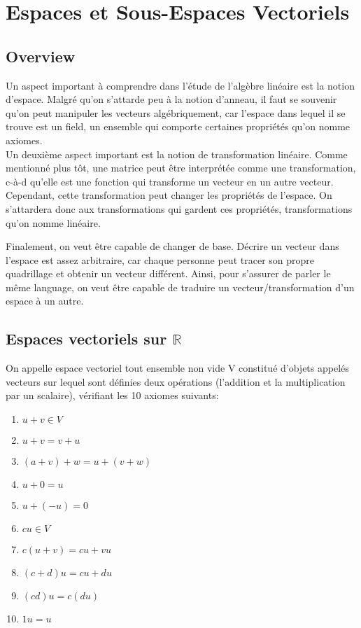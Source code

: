 \documentclass{article}
\begin{document}
\pagebreak

\section{Espaces et Sous-Espaces Vectoriels}
\subsection{Overview}

Un aspect important à comprendre dans l'étude de l'algèbre linéaire est la notion
d'espace. Malgré qu'on s'attarde peu à la notion d'anneau, il faut se souvenir
qu'on peut manipuler les vecteurs algébriquement, car l'espace dans lequel il se
trouve est un field, un ensemble qui comporte certaines propriétés qu'on nomme
axiomes.\\

Un deuxième aspect important est la notion de transformation linéaire. Comme mentionné
plus tôt, une matrice peut être interprétée comme une transformation, c-à-d qu'elle
est une fonction qui transforme un vecteur en un autre vecteur. Cependant, cette
transformation peut changer les propriétés de l'espace. On s'attardera donc aux
transformations qui gardent ces propriétés, transformations qu'on nomme linéaire.

Finalement, on veut être capable de changer de base. Décrire un vecteur dans
l'espace est assez arbitraire, car chaque personne peut tracer son propre quadrillage
et obtenir un vecteur différent. Ainsi, pour s'assurer de parler le même language,
on veut être capable de traduire un vecteur/transformation d'un espace à un autre.

\subsection{Espaces vectoriels sur $\mathbb{R}$}

\begin{definition}
    On appelle espace vectoriel tout ensemble non vide V constitué
    d'objets appelés vecteurs sur lequel sont définies deux opérations
    (l'addition et la multiplication par un scalaire), vérifiant les
    10 axiomes suivants:
    \begin{enumerate}
	\item $u+v \in V$
	\item $u+v = v+u$
	\item $(a+v)+w=u+(v+w)$
	\item $u+0=u$
	\item $u+(-u)=0$
	\item $ cu \in V$
	\item $ c(u+v)=cu+vu$
	\item $ (c+d)u=cu+du$
	\item $ (cd)u=c(du)$
	\item $1u=u$
    \end{enumerate}
\end{definition}
\end{document}
